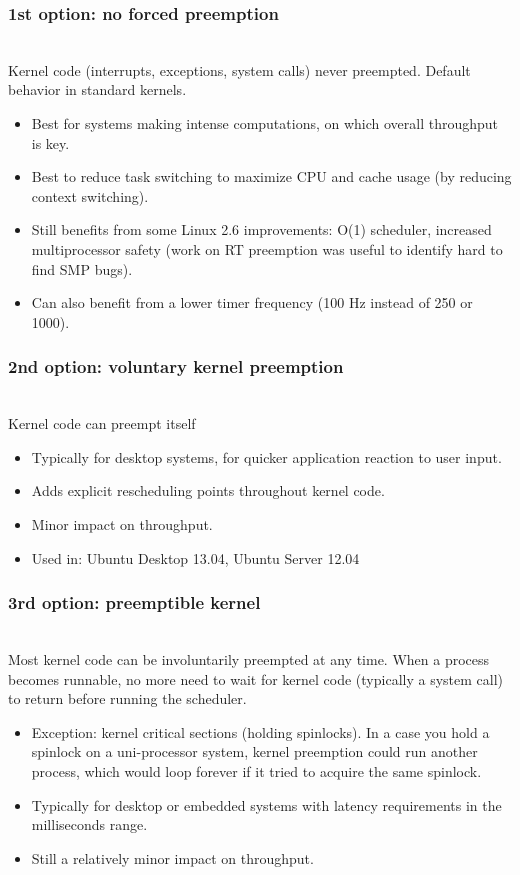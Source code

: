 \begin{frame}
  \frametitle{1st option: no forced preemption}
  \\
  Kernel code (interrupts, exceptions, system calls) never preempted.
  Default behavior in standard kernels.
  \begin{itemize}
  \item Best for systems making intense computations, on which overall
    throughput is key.
  \item Best to reduce task switching to maximize CPU and cache usage
    (by reducing context switching).
  \item Still benefits from some Linux 2.6 improvements: O(1)
    scheduler, increased multiprocessor safety (work on RT preemption
    was useful to identify hard to find SMP bugs).
  \item Can also benefit from a lower timer frequency (100 Hz instead
    of 250 or 1000).
  \end{itemize}
\end{frame}

\begin{frame}
  \frametitle{2nd option: voluntary kernel preemption}
  \\
  Kernel code can preempt itself
  \begin{itemize}
  \item Typically for desktop systems, for quicker application
    reaction to user input.
  \item Adds explicit rescheduling points throughout kernel code.
  \item Minor impact on throughput.
  \item Used in: Ubuntu Desktop 13.04, Ubuntu Server 12.04
  \end{itemize}
\end{frame}

\begin{frame}
  \frametitle{3rd option: preemptible kernel}
  \\
  Most kernel code can be involuntarily preempted at any time.  When a
  process becomes runnable, no more need to wait for kernel code
  (typically a system call) to return before running the scheduler.
  \begin{itemize}
  \item Exception: kernel critical sections (holding spinlocks).
    In a case you hold a spinlock on a uni-processor system, kernel preemption
    could run another process, which would loop forever if it
    tried to acquire the same spinlock.
  \item Typically for desktop or embedded systems with latency
    requirements in the milliseconds range.
  \item Still a relatively minor impact on throughput.
  \end{itemize}
\end{frame}

